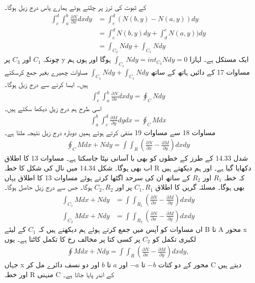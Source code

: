 \documentclass{book}
\begin{document}
\begin{urdufont}
کے ثبوت کی ترز پر چلتے ہوئے ہمارے پاس درج زیل ہوگا۔
\begin{align}
    \int_{c}^{d} \int_{a}^{b} \frac{\partial N}{\partial x} dx dy &= \int_{c}^{d} (N(b,y)-N(a,y)) dy\\
    &= \int_{c}^{d} N(b,y) dy + \int_{d}^{c} N(a,y)) dy\\
    &= \int_{C_2} N dy + \int_{C_1} N dy
\end{align}
چونکہ 
$C_1$
اور 
$C_3$
پر 
y
ایک مستکل ہے۔ لہازا
$\int_{C_1} N dy = int_{C_3} N dy = 0$
ہوگا اور ہوں ہم مساوات 
17
کے دائیں ہاتھ کے ساتھ 
$\int_{C_1} N dy + \int_{C_1} N dy$
مساوات چھیرے بغیر جمع کرسکتے ہیں۔ ایسا کرنے سے درج زیل ہوگا۔ 
\begin{align}
    \int_c^d \int_{a}^{b} \frac{\partial N}{\partial x} dx dy = \oint_C N dy
\end{align}
اسی طرح ہم درج زیل دیکھا سکتے ہیں۔
\begin{align}
    \int_{a}^{b} \int_c^d  \frac{\partial M}{\partial y} dy dx  = \oint_C M dx
\end{align}
مساوات 
18
سے مساوات 
19
منفی کرتے ہوئے ہمیں دوبارہ درج زیل نتیجہ ملتا ہے۔
\begin{align}
    \oint_C M dx + N dy = \int \int_R (\frac{\partial N}{\partial x} - \frac{\partial M}{\partial y}) dx dy
\end{align}
شدل
14.33
کے طرز کے خطوں کو بھی با آسانی نپٹا جاسکتا ہے۔ مساوات 
13
کا اطلاق اب بھی ہوگا۔ شکل 
14.34
 میں نال کی شکل کا خطہ
R
دکھایا گیا ہے۔
 اور ہم دیکھتے 
ہیں کہ خطہ
$R_1$
اور 
$R_2$
کے ساتھ ان کی سرحد اگٹھا کرتے ہوئے مساوات 
13
کا اطلاق یہاں بھی ہوگا۔ 
مسلئہ گریں کا اطلاق 
$C_1, R_1$
پر اور
$C_2, R_2$
ہوگا۔ جس سے درج زیل حاصل ہوگا۔
\begin{align}
    \int_{C_1} M dx + N dy &= \int \int_{R_1} (\frac{\partial N}{\partial x} - \frac{\partial M}{\partial y}) dx dy \\
    \int_{C_2} M dx + N dy &= \int \int_{R_2} (\frac{\partial N}{\partial x} - \frac{\partial M}{\partial y}) dx dy
\end{align}
اں مساوات کو آپس میں جمع کرتے ہوئے ہم دیکھتے ہیں کہ 
$C_1$
کے لیئے
B
تا 
A
محور
x
لکیری تکمل کو
$C_2$
پر کسی کتا پر مخالف رخ کا تکمل کاٹتا ہے۔ یوں 
\begin{align}
    \oint M dx + N dy = \int \int_R (\frac{\partial N}{\partial x} - \frac{\partial M}{\partial y}) dx dy,
\end{align}
جہاں 
x
محور کے دو کتات 
$-b$
تا
$-a$
اور
$a$
تا
$b$
اور دو نسف دائرے مل کر
C
دیتے ہیں اور خطہ 
R
منہنی 
C
کے اندر پایا جاتا ہے۔


\end{urdufont}
\end{document}
